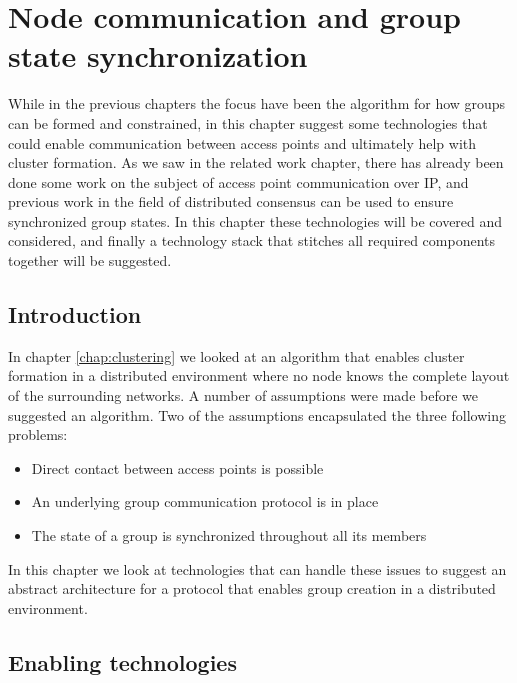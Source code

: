 \chapter{Node communication and group state synchronization}
\label{chap:proto}
While in the previous chapters the focus have been the algorithm for how groups can be formed and constrained, in this chapter suggest some technologies
that could enable communication between access points and ultimately help with cluster formation. As we saw in the related work chapter, there
has already been done some work on the subject of access point communication over IP, and previous work in the field of distributed consensus can be used to ensure synchronized group states.
In this chapter these technologies will be covered and considered, and finally a technology stack that stitches all required components together will be suggested. 


\section{Introduction}
In chapter \ref{chap:clustering} we looked at an algorithm that enables cluster formation in a distributed environment where no node knows the complete layout of the surrounding networks.
A number of assumptions were made before we suggested an algorithm. Two of the assumptions encapsulated the three following problems:
\begin{itemize}
\item Direct contact between access points is possible
\item An underlying group communication protocol is in place
\item The state of a group is synchronized throughout all its members
\end{itemize}
In this chapter we look at technologies that can handle these issues to suggest an abstract architecture for a protocol that enables group creation in a distributed environment.

\section{Enabling technologies}
